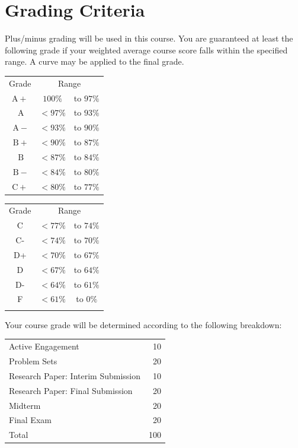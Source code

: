 \documentclass{syllabus}
\begin{document}
\newpage
\section*{Grading Criteria}

Plus/minus grading will be used in this course. You are guaranteed at least the following grade if your weighted average course score falls within the specified range. A curve may be applied to the final grade.

\begin{center}
\begin{minipage}[t]{0.75\textwidth}
\begin{tabular}{|ccc|}
\hline
Grade & \multicolumn{2}{c|}{Range} \\
$\mathrm{A}+$ & $100 \%$ & to $97 \%$ \\
$\mathrm{~A}$ & $<97 \%$ & to $93 \%$ \\
$\mathrm{~A}-$ & $<93 \%$ & to $90 \%$ \\
$\mathrm{~B}+$ & $<90 \%$ & to $87 \%$ \\
$\mathrm{~B}$ & $<87 \%$ & to $84 \%$ \\
$\mathrm{~B}-$ & $<84 \%$ & to $80 \%$ \\
$\mathrm{C}+$ & $<80 \%$ & to $77 \%$ \\
\hline
\end{tabular} \hspace{2cm}
\begin{tabular}{|ccc|}
\hline
Grade & \multicolumn{2}{c|}{Range} \\
C & $<77 \%$ & to $74 \%$ \\
C- & $<74 \%$ & to $70 \%$ \\
D+ & $<70 \%$ & to $67 \%$ \\
D & $<67 \%$ & to $64 \%$ \\
D- & $<64 \%$ & to $61 \%$ \\
F & $<61 \%$ & to $0 \%$ \\
 &  &  \\
\hline
\end{tabular}
\end{minipage}
\end{center} 

Your course grade will be determined according to the following breakdown:

\begin{center}
\begin{tabularx}{0.65\textwidth}{Xr}
\hline

Active Engagement & 10 \\
Problem Sets & 20 \\
Research Paper: Interim Submission & 10 \\
Research Paper: Final Submission & 20 \\
Midterm & 20 \\
Final Exam & 20 \\
\hline
Total & 100 \\
\hline
\end{tabularx}
\end{center}
\end{document}
